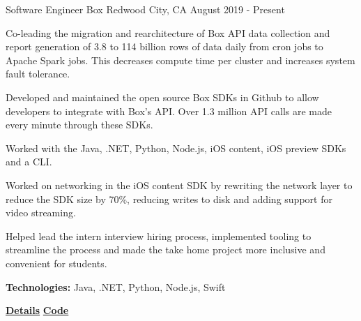 
\begin{cventries}
  \cventry
    {Software Engineer} %
    {Box} %
    {Redwood City, CA} %
    {August 2019 - Present} %
    {
      \begin{cvitems} %
        \item{Co-leading the migration and rearchitecture of Box API data collection and report generation of 3.8 to 114 billion rows of data daily from cron jobs to Apache Spark jobs. This decreases compute time per cluster and increases system fault tolerance.}
        \item{Developed and maintained the open source Box SDKs in Github to allow developers to integrate with Box's API. Over 1.3 million API calls are made every minute through these SDKs.}
        \item{Worked with the Java, .NET, Python, Node.js, iOS content, iOS preview SDKs and a CLI.}
        \item{Worked on networking in the iOS content SDK by rewriting the network layer to reduce the SDK size by 70\%, reducing writes to disk and adding support for video streaming.}
        \item{Helped lead the intern interview hiring process, implemented tooling to streamline the process and made the take home project more inclusive and convenient for students.}
        {\setlength \itemindent{-2ex} \itemsep2pt \item[] \textbf{Technologies:} Java, .NET, Python, Node.js, Swift}
        {\setlength \itemindent{-2ex} \itemsep2pt \item[] 
        \href{https://sujaygarlanka.com/experience.html\#box}{ \faInfoCircle \textbf{{ Details}}}
        \href{https://github.com/box/sdks}{ \faGithub \textbf{{ Code}}}}
      \end{cvitems}
    }
    

\end{cventries}
